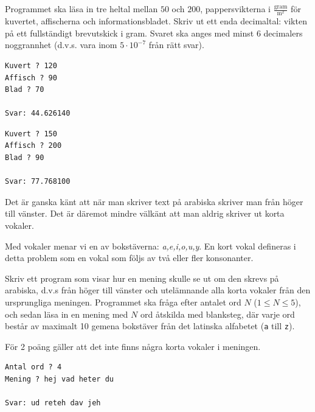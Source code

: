 Programmet ska läsa in tre heltal mellan $50$ och $200$, pappersvikterna i $\frac{\text{gram}}{\text{m}^2}$ för kuvertet, affischerna och informationsbladet. Skriv ut ett enda decimaltal: vikten på ett fullständigt brevutskick i gram. Svaret ska anges med minst $6$ decimalers noggrannhet (d.v.s. vara inom $5 \cdot 10^{-7}$ från rätt svar).


\vspace{1cm}

\begin{verbatim}
Kuvert ? 120
Affisch ? 90
Blad ? 70

Svar: 44.626140
\end{verbatim}

\vspace{1cm}

\begin{verbatim}
Kuvert ? 150
Affisch ? 200
Blad ? 90

Svar: 77.768100
\end{verbatim}



\newpage
{}

Det är ganska känt att när man skriver text på arabiska skriver man från höger till vänster.
Det är däremot mindre välkänt att man aldrig skriver ut korta vokaler.

Med vokaler menar vi en av bokstäverna: \textit{a,e,i,o,u,y}.
En kort vokal defineras i detta problem som en vokal som följs av två eller fler konsonanter.

Skriv ett program som visar hur en mening skulle se ut om den skrevs på arabiska, d.v.s från höger till vänster och utelämnande alla korta vokaler från den ursprungliga meningen. Programmet ska fråga efter antalet ord $N$ ($1 \le N \le 5$), och sedan läsa in en mening med $N$ ord åtskilda med blanksteg, där varje ord består av maximalt 10 gemena bokstäver från det latinska alfabetet (\texttt{a} till \texttt{z}).


 För 2 poäng gäller att det inte finns några korta vokaler i meningen.

\vspace{1cm}



\begin{verbatim}
Antal ord ? 4
Mening ? hej vad heter du

Svar: ud reteh dav jeh
\end{verbatim}

